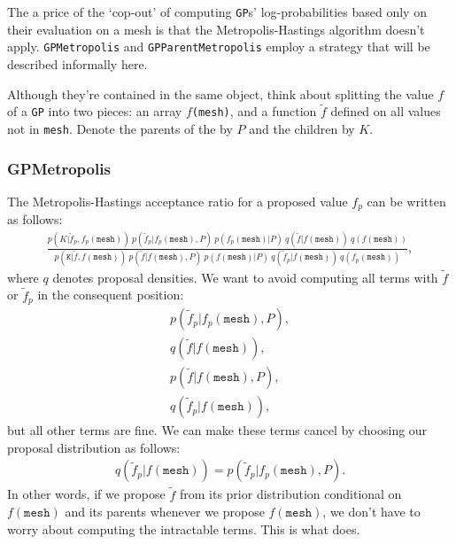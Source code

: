 \documentclass[]{manual}
\begin{document}
The a price of the `cop-out' of computing \texttt{GP}s' log-probabilities based only on their evaluation on a mesh is that the Metropolis-Hastings algorithm doesn't apply. \texttt{GPMetropolis} and \texttt{GPParentMetropolis} employ a strategy that will be described informally here.

Although they're contained in the same object, think about splitting the value $f$ of a \texttt{GP} into two pieces: an array $f$\texttt{(mesh)}, and a function $\tilde f$ defined on all values not in \texttt{mesh}. Denote the parents of the  by $P$ and the children by $K$.

\subsubsection{GPMetropolis} 
The Metropolis-Hastings acceptance ratio for a proposed value $f_p$ can be written as follows:
\begin{eqnarray*}
    \frac{p(K|\tilde f_p, f_p(\mathtt{mesh}))\ p(\tilde f_p|f_p(\mathtt{mesh}), P)\ p(f_p(\mathtt{mesh}) | P)\ q(\tilde f|f(\mathtt{mesh}))\ q(f(\mathtt{mesh}))}{p(\mathtt{K}|\tilde f, f(\mathtt{mesh}))\ p(\tilde f|f(\mathtt{mesh}), P)\ p(f(\mathtt{mesh}) | P)\ q(\tilde f_p|f(\mathtt{mesh}))\ q(f_p(\mathtt{mesh}))},
\end{eqnarray*}
where $q$ denotes proposal densities. We want to avoid computing all terms with $\tilde f$ or $\tilde f_p$ in the consequent position:
\begin{eqnarray*}
    p(\tilde f_p|f_p(\texttt{mesh}), P),\\ q(\tilde f|f(\texttt{mesh})),\\ p(\tilde f|f(\texttt{mesh}), P),\\ q(\tilde f_p|f(\texttt{mesh})),
\end{eqnarray*}
but all other terms are fine. We can make these terms cancel by choosing our proposal distribution as follows:
\begin{eqnarray*}
    q(\tilde f_p|f(\texttt{mesh})) = p(\tilde f_p|f_p(\texttt{mesh}), P).
\end{eqnarray*}
In other words, if we propose $\tilde f$ from its prior distribution conditional on $f(\texttt{mesh})$ and its parents whenever we propose $f(\texttt{mesh})$, we don't have to worry about computing the intractable terms. This is what  does. 
\end{document}
